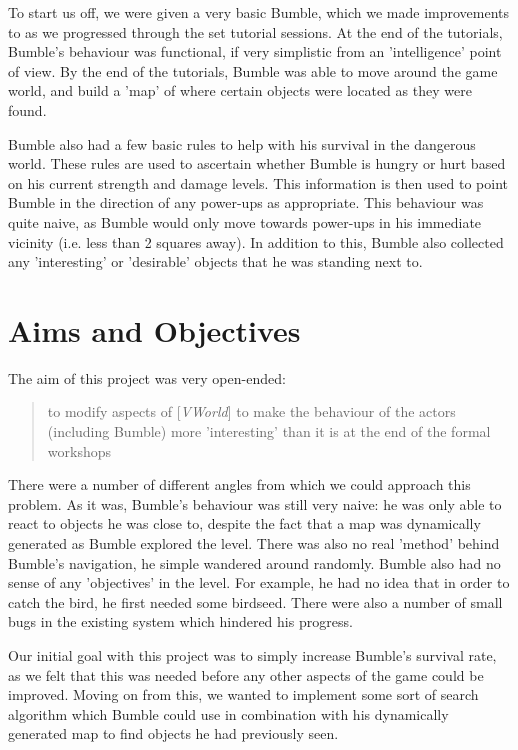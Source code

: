 \documentclass[a4paper,oneside]{report}
\begin{document}
To start us off, we were given a very basic Bumble, which we made improvements to as we progressed through the set tutorial sessions. At the end of the tutorials, Bumble's behaviour was functional, if very simplistic from an 'intelligence' point of view. By the end of the tutorials, Bumble was able to move around the game world, and build a 'map' of where certain objects were located as they were found. 

Bumble also had a few basic rules to help with his survival in the dangerous world. These rules are used to ascertain whether Bumble is hungry or hurt based on his current strength and damage levels. This information is then used to point Bumble in the direction of any power-ups as appropriate. This behaviour was quite naive, as Bumble would only move towards power-ups in his immediate vicinity (i.e. less than 2 squares away). In addition to this, Bumble also collected any 'interesting' or 'desirable' objects that he was standing next to.

\section{Aims and Objectives}

The aim of this project was very open-ended:

\begin{quotation} 
to modify aspects of [\emph{VWorld}] to make the behaviour of the actors (including Bumble) more 'interesting' than it is at the end of the formal workshops 
\end{quotation}

There were a number of different angles from which we could approach this problem. As it was, Bumble's behaviour was still very naive: he was only able to react to objects he was close to, despite the fact that a map was dynamically generated as Bumble explored the level. There was also no real 'method' behind Bumble's navigation, he simple wandered around randomly. Bumble also had no sense of any 'objectives' in the level. For example, he had no idea that in order to catch the bird, he first needed some birdseed. There were also a number of small bugs in the existing system which hindered his progress. 

Our initial goal with this project was to simply increase Bumble's survival rate, as we felt that this was needed before any other aspects of the game could be improved. Moving on from this, we wanted to implement some sort of search algorithm which Bumble could use in combination with his dynamically generated map to find objects he had previously seen.
\end{document}
